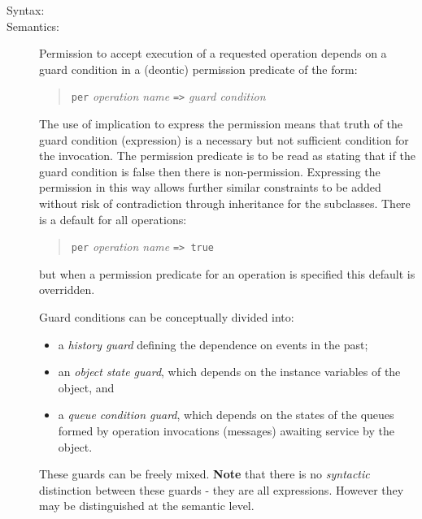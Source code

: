 \documentclass[\pformat,12pt]{article}
\newcommand{\vppsmall}{\small\tt}
\begin{document}
\begin{description}
\item[Syntax:] 


\item[Semantics:] Permission to accept execution of a requested
operation depends on a guard condition in a (deontic) permission
predicate of the form:

\begin{quote}
{\vppsmall per} {\em operation name} {\vppsmall =>} {\em guard condition}
\end{quote}

The use of implication to express the permission means that truth of
the guard condition (expression) is a necessary but not sufficient
condition for the invocation. The permission predicate is to be read
as stating that if the guard condition is false then there is
non-permission. Expressing the permission in this way allows further
similar constraints to be added without risk of contradiction through
inheritance for the subclasses. There is a default for all operations:

\begin{quote}
{\vppsmall per} {\em operation name} {\vppsmall => true}
\end{quote}

but when a permission predicate for an operation is specified
this default is overridden.

Guard conditions can be conceptually divided into:
\begin{itemize}
\item
a {\em history guard} defining the dependence on events in the past;
\item
an {\em object state guard}, which depends on the instance variables of the
object, and
\item
a {\em queue condition guard}, which depends on the
states of the queues formed by operation invocations (messages) awaiting
service by the object.
\end{itemize}
These guards can be freely mixed. \textbf{Note} that there is no
\textit{syntactic} distinction between these guards - they are all
expressions. However they may be distinguished at the semantic level.


\end{description}
\end{document}
